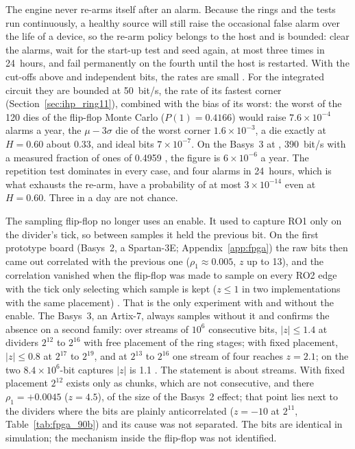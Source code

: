 The engine never re-arms itself after an alarm. Because the rings and the
tests run continuously, a healthy source will still raise the occasional
false alarm over the life of a device, so the re-arm policy belongs to the
host and is bounded: clear the alarms, wait for the start-up test and
seed again, at most three times in 24~hours, and fail permanently on the
fourth until the host is restarted. With the cut-offs above and
independent bits, the rates are small \est{}. For the integrated circuit
they are bounded at 50~bit/s, the rate of its fastest corner
(Section~\ref{sec:ihp_ring11}), combined with the bias of its worst: the
worst of the 120 dies of the flip-flop Monte Carlo
($P(1) = 0.4166$) would raise $7.6\times10^{-4}$ alarms a year, the
$\mu - 3\sigma$ die of the worst corner $1.6\times10^{-3}$, a die exactly
at $H = 0.60$ about 0.33, and ideal bits $7\times10^{-7}$. On the Basys~3
at , 390~bit/s with a measured fraction of ones of 0.4959
\meas{}, the figure is $6\times10^{-6}$ a year. The repetition test
dominates in every case, and four alarms in 24~hours, which is what
exhausts the re-arm, have a probability of at most $3\times10^{-14}$
even at $H = 0.60$. Three in a day are not chance.

The sampling flip-flop no longer uses an enable. It used to capture RO1
only on the divider's tick, so between samples it held the previous bit.
On the first prototype board (Basys~2, a Spartan-3E;
Appendix~\ref{app:fpga}) the raw bits then came out correlated with the
previous one
($\rho_1 \approx 0.005$, $z$ up to 13), and the correlation vanished when
the flip-flop was made to sample on every RO2 edge with the tick only
selecting which sample is kept ($z \le 1$ in two implementations with the
same placement) \meas{}. That is the only experiment with and without
the enable. The Basys~3, an Artix-7, always samples without it and
confirms the absence on a second family: over streams of $10^6$
consecutive bits, $|z| \le 1.4$ at dividers $2^{12}$ to $2^{16}$ with
free placement of the ring stages; with fixed placement, $|z| \le 0.8$
at $2^{17}$ to $2^{19}$, and at $2^{13}$ to $2^{16}$ one stream of four
reaches $z = 2.1$; on the two $8.4\times10^6$-bit captures $|z|$ is 1.1
\meas{}. The statement is about streams. With fixed placement $2^{12}$
exists only as chunks, which are not consecutive, and there
$\rho_1 = +0.0045$ ($z = 4.5$), of the size of the Basys~2 effect; that
point lies next to the dividers where the bits are plainly
anticorrelated ($z = -10$ at $2^{11}$, Table~\ref{tab:fpga_90b}) and its
cause was not separated. The bits are
identical in simulation; the mechanism inside
the flip-flop was not identified.

